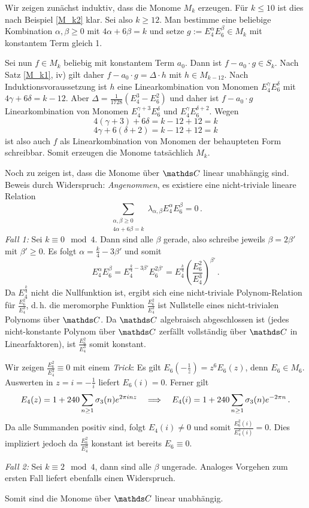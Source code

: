 \begin{bewe}
	Wir zeigen zunächst induktiv, dass die Monome $M_k$ erzeugen. Für $k \leq 10$ ist dies nach Beispiel \ref{M_k2} klar. Sei also $k \geq 12$. Man bestimme eine beliebige Kombination $\alpha, \beta \geq 0$ mit $4 \alpha + 6 \beta = k$ und setze $g := E_4^\alpha E_6^\beta \in M_k$ mit konstantem Term gleich 1.
	
	Sei nun $f \in M_k$ beliebig mit konstantem Term $a_0$. Dann ist $f - a_0 \cdot g \in S_k$. Nach Satz \ref{M_k1}, iv) gilt daher $f - a_0 \cdot g = \Delta \cdot h$ mit $h \in M_{k-12}$. Nach Induktionsvoraussetzung ist $h$ eine Linearkombination von Monomen $E_4^\gamma E_6^\delta$ mit $4 \gamma + 6 \delta = k - 12$. Aber $\Delta = \frac{1}{1728} (E_4^3 - E_6^2)$ und daher ist $f - a_0 \cdot g$ Linearkombination von Monomen $E_4^{\gamma + 3}E_6^{\delta}$ und $E_4^{\gamma}E_6^{\delta + 2}$. Wegen
	\[
	4(\gamma + 3) + 6 \delta = k - 12 + 12 = k
	\]
	\[
	4 \gamma + 6 (\delta + 2) = k - 12 + 12 = k
	\]
	ist also auch $f$ als Linearkombination von Monomen der behaupteten Form schreibbar. Somit erzeugen die Monome tatsächlich $M_k$.
	
	Noch zu zeigen ist, dass die Monome über $\CC$ linear unabhängig sind. Beweis durch Widerspruch: \emph{Angenommen}, es existiere eine nicht-triviale lineare Relation
	\[
	\sum_{\substack{\alpha, \beta \geq 0\\ 4 \alpha + 6 \beta = k}} \lambda_{\alpha, \beta} E_4^\alpha E_6^\beta = 0
	\,.
	\]
	\emph{Fall 1:} Sei $k \equiv 0 \mod 4$. Dann sind alle $\beta$ gerade, also schreibe jeweils $\beta = 2 \beta'$ mit $\beta' \geq 0$. Es folgt $\alpha = \frac k4 - 3 \beta'$ und somit
	\[
	E_4^\alpha E_6^\beta = E_4^{\frac k4 - 3\beta'}E_6^{2\beta'} = E_4^{\frac k4} \left( \frac {E_6^2}{E_4^3} \right)^{\beta'}
	\,.
	\]
	Da $E_4^{\frac k4}$ nicht die Nullfunktion ist, ergibt sich eine nicht-triviale Polynom-Relation für $\frac{E_6^2}{E_4^3}$, d.\,h. die meromorphe Funktion $\frac{E_6^2}{E_4^3}$ ist Nullstelle eines nicht-trivialen Polynoms über $\CC$. Da $\CC$ algebraisch abgeschlossen ist (jedes nicht-konstante Polynom über $\CC$ zerfällt vollständig über $\CC$ in Linearfaktoren), ist $\frac{E_6^2}{E_4^3}$ somit konstant.
	
	Wir zeigen $\frac{E_6^2}{E_4^3} \equiv 0$ mit einem \emph{Trick}: Es gilt $E_6 (- \frac 1z) = z^6 E_6(z)$, denn $E_6 \in M_6$. Auswerten in $z = i = - \frac 1i$ liefert $E_6 (i) = 0$. Ferner gilt
	\[
	E_4(z) = 1 + 240 \sum_{n \geq 1} \sigma_3 (n) e^{2\pi i n z} \quad \Longrightarrow \quad E_4 (i) = 1 + 240 \sum_{n \geq 1} \sigma_3 (n) e^{-2 \pi n}
	\,.
	\] 
	Da alle Summanden positiv sind, folgt $E_4(i) \neq 0$ und somit $\frac{E_6^2(i)}{E_4^3(i)} = 0$. Dies impliziert jedoch da $\frac{E_6^2}{E_4^3}$ konstant ist bereits $E_6 \equiv 0$. \blitz
	
	\emph{Fall 2:} Sei $k \equiv 2 \mod 4$, dann sind alle $\beta$ ungerade. Analoges Vorgehen zum ersten Fall liefert ebenfalls einen Widerspruch.
	
	Somit sind die Monome über $\CC$ linear unabhängig.
\end{bewe}

